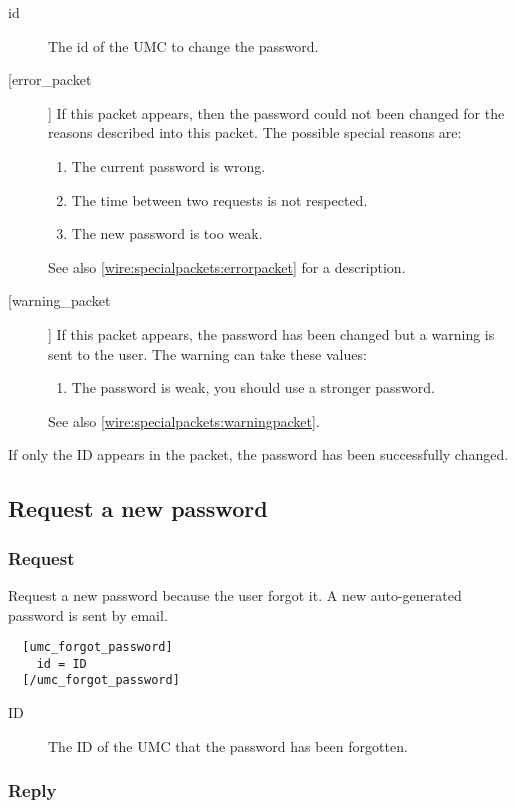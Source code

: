 \begin{description}
\item[id]
  The id of the UMC to change the password.

\item[[error\_packet]]
  If this packet appears, then the password could not been changed for the reasons described into this packet.
  The possible special reasons are:
  \begin{enumerate}
    \item The current password is wrong.
    \item The time between two requests is not respected.
    \item The new password is too weak.
  \end{enumerate}
  See also \cref{wire:specialpackets:errorpacket} for a description.

\item[[warning\_packet]]
  If this packet appears, the password has been changed but a warning is sent to the user. The warning can take these values:
  \begin{enumerate}
    \item The password is weak, you should use a stronger password.
  \end{enumerate}
  See also \cref{wire:specialpackets:warningpacket}.
\end{description}
If only the ID appears in the packet, the password has been successfully changed.

\subsection{Request a new password}
\label{wire:request_new_password}

\subsubsection{Request}
Request a new password because the user forgot it. A new auto-generated password is sent by email.
\begin{lstlisting}
  [umc_forgot_password]
    id = ID
  [/umc_forgot_password]
\end{lstlisting}
\begin{description}
 \item [ID] The ID of the UMC that the password has been forgotten.
\end{description}

\subsubsection{Reply}

